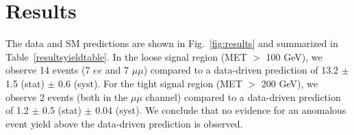 
\section{Results}
\label{sec:results}

The data and SM predictions are shown in Fig.~\ref{fig:results} and summarized in Table~\ref{resultsyieldtable}.
In the loose signal region (MET $>$ 100 GeV), we observe 14 events (7 $ee$ and 7 $\mu\mu$)
compared to a data-driven prediction of 13.2 $\pm$ 1.5 (stat) $\pm$ 0.6 (syst).
For the tight signal region (MET $>$ 200 GeV),
we observe 2 events (both in the $\mu\mu$ channel) compared to a 
data-driven prediction of 1.2 $\pm$ 0.5 (stat) $\pm$ 0.04 (syst).
We conclude that no evidence for an anomalous event yield above the data-driven prediction is observed.
